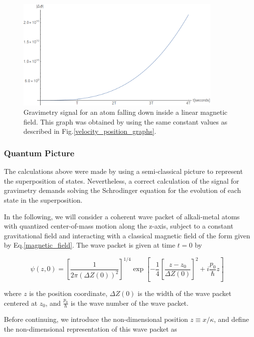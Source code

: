 \documentclass{article}
\begin{document}
\begin{figure}
\centering
\includegraphics[width=0.9\textwidth]{fase.png}
\caption{Gravimetry signal for an atom falling down inside a linear magnetic field. This graph was obtained by using the same constant values as described in Fig.\ref{velocity_position_graphs}.}
\label{phase_graph}
\end{figure}

\subsubsection{Quantum Picture}
The calculations above were made by using a semi-classical picture to represent the superposition of states. Nevertheless, a correct calculation of the signal for gravimetry demands solving the Schrodinger equation for the evolution of each state in the superposition. 

In the following, we will consider a coherent wave packet of alkali-metal atoms with quantized center-of-mass motion along the z-axis, subject to a constant gravitational field and interacting with a classical magnetic field of the form given by Eq.\ref{magnetic_field}. The wave packet is given at time $t=0$ by

\begin{equation}\label{wave_packet}
\psi(z,0) = 
\left[\frac{1}{2 \pi (\Delta Z(0))^2} \right]^{1/4} \exp \left[-\frac{1}{4} \left[\frac{z-z_{0}}{\Delta Z(0)}\right]^{2}  + i \frac{p_{0}}{\hbar}z \right]
\end{equation}

where $z$ is the position coordinate, $\Delta Z(0)$ is the width of the wave packet centered at $z_{0}$, and $\frac{p_{0}}{\hbar}$ is the wave number of the wave packet. 

Before continuing, we introduce the non-dimensional position $z\equiv x/\kappa$, and define the non-dimensional representation of this wave packet as
\end{document}
